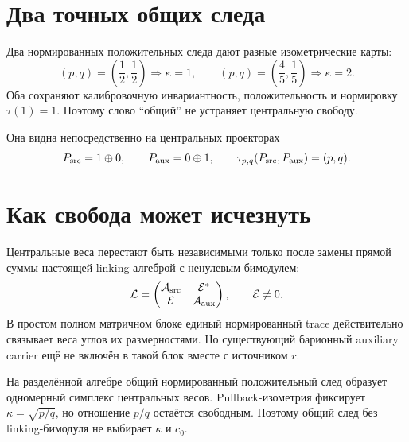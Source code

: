 \section{Два точных общих следа}

Два нормированных положительных следа дают разные изометрические карты:
\begin{equation}
 (p,q)=\left(\frac12,\frac12\right)\Longrightarrow\kappa=1,
 \qquad
 (p,q)=\left(\frac45,\frac15\right)\Longrightarrow\kappa=2.
 \label{eq:v8-baryon-c0-two-trace-witnesses}
\end{equation}
Оба сохраняют калибровочную инвариантность, положительность и нормировку
$\tau(1)=1$. Поэтому слово ``общий'' не устраняет центральную свободу.

Она видна непосредственно на центральных проекторах
\begin{equation}
 P_{\rm src}=1\oplus0,
 \qquad P_{\rm aux}=0\oplus1,
 \qquad
 \tau_{p,q}(P_{\rm src},P_{\rm aux})=(p,q).
 \label{eq:v8-baryon-c0-central-projector-weights}
\end{equation}

\section{Как свобода может исчезнуть}

Центральные веса перестают быть независимыми только после замены прямой
суммы настоящей linking-алгеброй с ненулевым бимодулем:
\begin{equation}
 \mathcal L=
 \begin{pmatrix}
 \mathcal A_{\rm src}&\mathcal E^*\\
 \mathcal E&\mathcal A_{\rm aux}
 \end{pmatrix},
 \qquad \mathcal E\ne0.
 \label{eq:v8-baryon-c0-required-linking-algebra}
\end{equation}
В простом полном матричном блоке единый нормированный trace действительно
связывает веса углов их размерностями. Но существующий барионный auxiliary
carrier ещё не включён в такой блок вместе с источником $r$.

\begin{theorem}
На разделённой алгебре общий нормированный положительный след образует
одномерный симплекс центральных весов. Pullback-изометрия фиксирует
$\kappa=\sqrt{p/q}$, но отношение $p/q$ остаётся свободным. Поэтому общий
след без linking-бимодуля не выбирает $\kappa$ и $c_0$.
\end{theorem}

